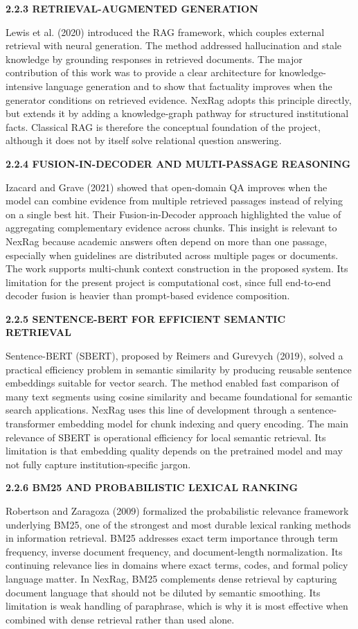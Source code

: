 \noindent\textbf{2.2.3 RETRIEVAL-AUGMENTED GENERATION}

Lewis et al. (2020) introduced the RAG framework, which couples external retrieval with neural generation. The method addressed hallucination and stale knowledge by grounding responses in retrieved documents. The major contribution of this work was to provide a clear architecture for knowledge-intensive language generation and to show that factuality improves when the generator conditions on retrieved evidence. NexRag adopts this principle directly, but extends it by adding a knowledge-graph pathway for structured institutional facts. Classical RAG is therefore the conceptual foundation of the project, although it does not by itself solve relational question answering.

\noindent\textbf{2.2.4 FUSION-IN-DECODER AND MULTI-PASSAGE REASONING}

Izacard and Grave (2021) showed that open-domain QA improves when the model can combine evidence from multiple retrieved passages instead of relying on a single best hit. Their Fusion-in-Decoder approach highlighted the value of aggregating complementary evidence across chunks. This insight is relevant to NexRag because academic answers often depend on more than one passage, especially when guidelines are distributed across multiple pages or documents. The work supports multi-chunk context construction in the proposed system. Its limitation for the present project is computational cost, since full end-to-end decoder fusion is heavier than prompt-based evidence composition.

\noindent\textbf{2.2.5 SENTENCE-BERT FOR EFFICIENT SEMANTIC RETRIEVAL}

Sentence-BERT (SBERT), proposed by Reimers and Gurevych (2019), solved a practical efficiency problem in semantic similarity by producing reusable sentence embeddings suitable for vector search. The method enabled fast comparison of many text segments using cosine similarity and became foundational for semantic search applications. NexRag uses this line of development through a sentence-transformer embedding model for chunk indexing and query encoding. The main relevance of SBERT is operational efficiency for local semantic retrieval. Its limitation is that embedding quality depends on the pretrained model and may not fully capture institution-specific jargon.

\noindent\textbf{2.2.6 BM25 AND PROBABILISTIC LEXICAL RANKING}

Robertson and Zaragoza (2009) formalized the probabilistic relevance framework underlying BM25, one of the strongest and most durable lexical ranking methods in information retrieval. BM25 addresses exact term importance through term frequency, inverse document frequency, and document-length normalization. Its continuing relevance lies in domains where exact terms, codes, and formal policy language matter. In NexRag, BM25 complements dense retrieval by capturing document language that should not be diluted by semantic smoothing. Its limitation is weak handling of paraphrase, which is why it is most effective when combined with dense retrieval rather than used alone.

